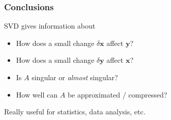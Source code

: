 \documentclass[xcolor={dvipsnames}]{beamer}
\begin{document}
\begin{frame}
\frametitle{Conclusions}
\begin{block}{SVD gives information about}
\begin{itemize}
    \item How does a small change $\delta \mathbf{x}$ affect $\mathbf{y}$?
    \item How does a small change $\delta \mathbf{y}$ affect $\mathbf{x}$?
    \item Is $A$ singular or \emph{almost} singular?
    \item How well can $A$ be approximated / compressed?
\end{itemize}
\end{block}
\begin{alertblock}{}
Really useful for statistics, data analysis, etc.
\end{alertblock}
\end{frame}







% 

% 
\end{document}
